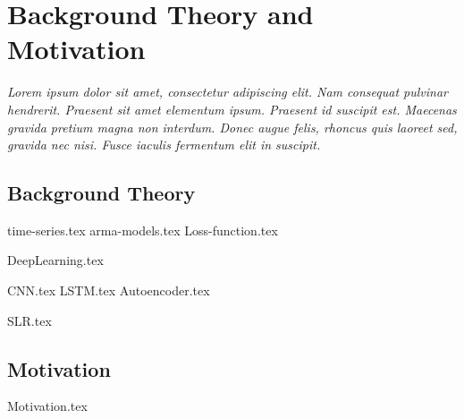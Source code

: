 \chapter{Background Theory and Motivation}\label{T-B}
\label{cha:TheoryAndBackground}

{\it Lorem ipsum dolor sit amet, consectetur adipiscing elit. Nam consequat pulvinar hendrerit. Praesent sit amet elementum ipsum. Praesent id suscipit est. Maecenas gravida pretium magna non interdum. Donec augue felis, rhoncus quis laoreet sed, gravida nec nisi. Fusce iaculis fermentum elit in suscipit.}



\section{Background Theory}
\label{sec:no1}
{time-series.tex}
{arma-models.tex}
{Loss-function.tex}

{DeepLearning.tex}

{CNN.tex}
{LSTM.tex}
{Autoencoder.tex}



{SLR.tex}



\section{Motivation}
\label{sec:no2}
{Motivation.tex}
